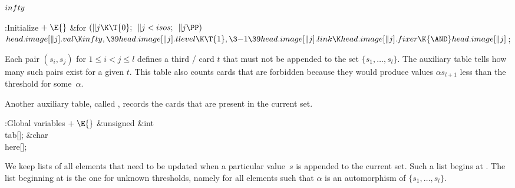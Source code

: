 \B\D$\\{infty}$ \5
\par
\Y\B\4:Initialize\X${}\mathrel+\E{}$\6
\&{for} ${}(\|j\K\T{0};{}$ ${}\|j<\\{isos};{}$ ${}\|j\PP){}$\1\5
${}\\{head}.\\{image}[\|j].\\{val}\K\\{infty},\39\\{head}.\\{image}[\|j].%
\\{tlevel}\K\T{1},\3{-1}\39\\{head}.\\{image}[\|j].\\{link}\K\\{head}.%
\\{image}[\|j].\\{fixer}\K{\AND}\\{head}.\\{image}[\|j]{}$;\2\par
\fi

Each pair $(s_i,s_j)$ for $1\le i<j\le l$ defines a third %
\SET/ card $t$
that must not be appended to the set $\{s_1,\ldots,s_l\}$. The auxiliary
table  tells how many such pairs exist for a given $t$.
This table also counts cards that are forbidden because they would
produce values $\alpha s_{l+1}$ less than the threshold for some~$\alpha$.

Another auxiliary table, called , records the cards that are
present
in the current set.

\Y\B\4:Global variables\X${}\mathrel+\E{}$\6
\&{unsigned} \&{int} \\{tab}[];\6
\&{char} \\{here}[];\par
\fi

We keep lists of all elements that need to be updated when
a particular
value~$s$ is appended to the current set. Such a list begins at
. The list beginning at  is the one for
unknown
thresholds, namely for all elements such that $\alpha$ is an automorphism
of $\{s_1,\ldots,s_l\}$.

